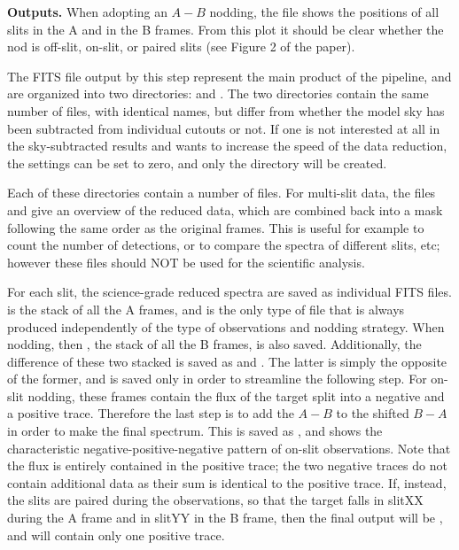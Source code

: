 \documentclass[a4paper]{article}
\begin{document}
\begin{sloppypar}
\medskip
\noindent
\textbf{Outputs.} When adopting an $A-B$ nodding, the file  shows the positions of all slits in the A and in the B frames. From this plot it should be clear whether the nod is off-slit, on-slit, or paired slits (see Figure 2 of the paper).

The FITS file output by this step represent the main product of the pipeline, and are organized into two directories:  and . The two directories contain the same number of files, with identical names, but differ from whether the model sky has been subtracted from individual cutouts or not. If one is not interested at all in the sky-subtracted results and wants to increase the speed of the data reduction, the settings  can be set to zero, and only the  directory will be created.

Each of these directories contain a number of files. For multi-slit data, the files  and  give an overview of the reduced data, which are combined back into a mask following the same order as the original frames. This is useful for example to count the number of detections, or to compare the spectra of different slits, etc; however these files should NOT be used for the scientific analysis.

For each slit, the science-grade reduced spectra are saved as individual FITS files.  is the stack of all the A frames, and is the only type of file that is always produced independently of the type of observations and nodding strategy. When nodding, then , the stack of all the B frames, is also saved. Additionally, the difference of these two stacked is saved as  and . The latter is simply the opposite of the former, and is saved only in order to streamline the following step. For on-slit nodding, these frames contain the flux of the target split into a negative and a positive trace. Therefore the last step is to add the $A-B$ to the shifted $B-A$ in order to make the final spectrum. This is saved as , and shows the characteristic negative-positive-negative pattern of on-slit observations. Note that the flux is entirely contained in the positive trace; the two negative traces do not contain additional data as their sum is identical to the positive trace. If, instead, the slits are paired during the observations, so that the target falls in slitXX during the A frame and in slitYY in the B frame, then the final output will be , and will contain only one positive trace.


\end{sloppypar}
\end{document}
